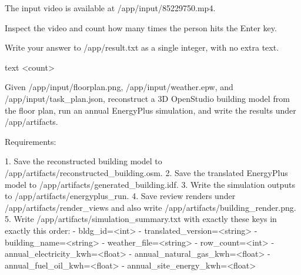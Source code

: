 \documentclass{llmxive}
\begin{document}
\begin{instructionbox}
The input video is available at \textasciigrave{}/app/input/85229750.mp4\textasciigrave{}.

Inspect the video and count how many times the person hits the Enter key.

Write your answer to \textasciigrave{}/app/result.txt\textasciigrave{} as a single integer, with no extra text.

\textasciigrave{}\textasciigrave{}\textasciigrave{}text
\textless{}count\textgreater{}
\textasciigrave{}\textasciigrave{}\textasciigrave{}
\end{instructionbox}

\begin{instructionbox}
Given \textasciigrave{}/app/input/floorplan.png\textasciigrave{}, \textasciigrave{}/app/input/weather.epw\textasciigrave{}, and \textasciigrave{}/app/input/task\_plan.json\textasciigrave{}, reconstruct a 3D OpenStudio building model from the floor plan, run an annual EnergyPlus simulation, and write the results under \textasciigrave{}/app/artifacts\textasciigrave{}.

Requirements:

1. Save the reconstructed building model to \textasciigrave{}/app/artifacts/reconstructed\_building.osm\textasciigrave{}.
2. Save the translated EnergyPlus model to \textasciigrave{}/app/artifacts/generated\_building.idf\textasciigrave{}.
3. Write the simulation outputs to \textasciigrave{}/app/artifacts/energyplus\_run\textasciigrave{}.
4. Save review renders under \textasciigrave{}/app/artifacts/render\_views\textasciigrave{} and also write \textasciigrave{}/app/artifacts/building\_render.png\textasciigrave{}.
5. Write \textasciigrave{}/app/artifacts/simulation\_summary.txt\textasciigrave{} with exactly these keys in exactly this order:
   - \textasciigrave{}bldg\_id=\textless{}int\textgreater{}\textasciigrave{}
   - \textasciigrave{}translated\_version=\textless{}string\textgreater{}\textasciigrave{}
   - \textasciigrave{}building\_name=\textless{}string\textgreater{}\textasciigrave{}
   - \textasciigrave{}weather\_file=\textless{}string\textgreater{}\textasciigrave{}
   - \textasciigrave{}row\_count=\textless{}int\textgreater{}\textasciigrave{}
   - \textasciigrave{}annual\_electricity\_kwh=\textless{}float\textgreater{}\textasciigrave{}
   - \textasciigrave{}annual\_natural\_gas\_kwh=\textless{}float\textgreater{}\textasciigrave{}
   - \textasciigrave{}annual\_fuel\_oil\_kwh=\textless{}float\textgreater{}\textasciigrave{}
   - \textasciigrave{}annual\_site\_energy\_kwh=\textless{}float\textgreater{}\textasciigrave{}


\end{instructionbox}
\end{document}
